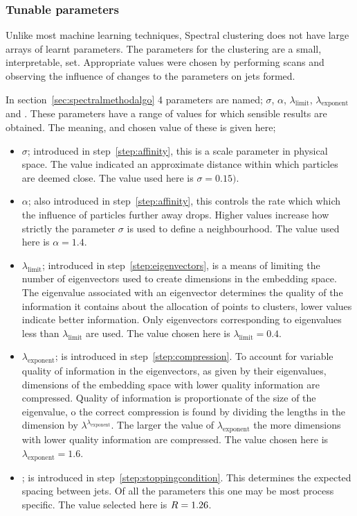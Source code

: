 \subsubsection{Tunable parameters}\label{sec:spectralmethodparam}
Unlike most machine learning techniques, Spectral clustering does not have large arrays of learnt parameters.
The parameters for the clustering are a small, interpretable, set.
Appropriate values were chosen by performing scans and observing the influence of changes to the parameters on jets formed.

In section~\ref{sec:spectralmethodalgo} 4 parameters are named;
\(\sigma\), \(\alpha\), \(\lambda_\text{limit}\), \(\lambda_\text{exponent}\) and \stoppingdeltar{}.
These parameters have a range of values for which sensible results are obtained.
The meaning, and chosen value of these is given here;
\begin{itemize}
    \item \(\sigma\); introduced in step~\ref{step:affinity}, this is a scale parameter in physical space.
                      The value indicated an approximate distance within which particles are deemed close.
                      The value used here is \(\sigma = 0.15)\).
    \item  \(\alpha\); also introduced in step~\ref{step:affinity}, this controls the rate which which 
           the influence of particles further away drops. 
           Higher values increase how strictly the parameter \(\sigma\) is used to define a neighbourhood.
           The value used here is \(\alpha = 1.4\).
       \item  \(\lambda_\text{limit}\); introduced in step~\ref{step:eigenvectors}, is a means of limiting the number of eigenvectors used
           to create dimensions in the embedding space.
           The eigenvalue associated with an eigenvector determines the quality of the information it contains about the allocation of points to clusters,
           lower values indicate better information.
           Only eigenvectors corresponding to eigenvalues less than \(\lambda_\text{limit}\) are used.
           The value chosen here is \(\lambda_\text{limit} = 0.4\).
       \item  \(\lambda_\text{exponent}\); is introduced in step~\ref{step:compression}.
           To account for variable quality of information in the eigenvectors, as given by their eigenvalues,
        dimensions of the embedding space with lower quality information are compressed.
        Quality of information is proportionate of the size of the eigenvalue, o the correct compression is found by
        dividing the lengths in the dimension by \(\lambda^{\lambda_\text{exponent}}\).
        The larger the value of \(\lambda_\text{exponent}\) the more dimensions with lower quality information are compressed.
        The value chosen here is \(\lambda_\text{exponent} = 1.6\).
    \item \stoppingdeltar{}; is introduced in step~\ref{step:stoppingcondition}.
         This determines the expected spacing between jets. 
         Of all the parameters this one may be most process specific.
         The value selected here is \(R{} = 1.26\).
\end{itemize}


